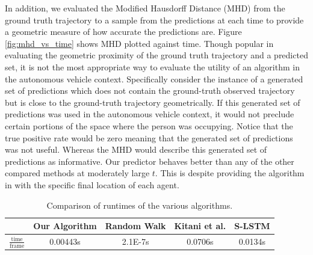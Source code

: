 \documentclass[letterpaper,10pt,conference]{ieeeconf}
\begin{document}
In addition, we evaluated the Modified Hausdorff Distance (MHD) \cite{Dubuisson1994} from the ground truth trajectory to a sample from the predictions at each time to provide a geometric measure of how accurate the predictions are. 
	Figure \ref{fig:mhd_vs_time} shows MHD plotted against time.
	Though popular in evaluating the geometric proximity of the ground truth trajectory and a predicted set, it is not the most appropriate way to evaluate the utility of an algorithm in the autonomous vehicle context. 
	Specifically consider the instance of a generated set of predictions which does not contain the ground-truth observed trajectory but is close to the ground-truth trajectory geometrically. 
	If this generated set of predictions was used in the autonomous vehicle context, it would not preclude certain portions of the space where the person was occupying. 
	Notice that the true positive rate would be zero meaning that the generated set of predictions was not useful.
	Whereas the MHD would describe this generated set of predictions as informative.
Our predictor behaves better than any of the other compared methods at moderately large $t$.
This is despite providing the algorithm in \cite{Kitani2012} with the specific final location of each agent.

\begin{table}
	\begin{center}
		\caption{Comparison of runtimes of the various algorithms.}
		\label{tab:time}
		\renewcommand{\arraystretch}{1.5}%
		\begin{tabular}{||c | c c  c c ||} 
			\hline
			& Our Algorithm & Random Walk & Kitani et al. & S-LSTM \\ [0.5ex] 
			\hline 
			$\frac{\mathrm{time}}{\mathrm{frame}}$ & 0.00443s & 2.1E-7s & 0.0706s & 0.0134s \\
			\hline
		\end{tabular}
	\end{center}
	\vspace*{-0.6cm}
\end{table}
\end{document}
